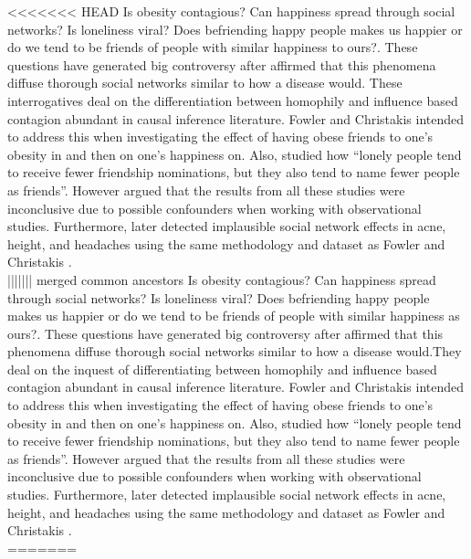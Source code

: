 \documentclass[11pt]{article}
\begin{document}
<<<<<<< HEAD
Is obesity contagious? Can happiness spread through social networks? Is loneliness viral? Does befriending happy people makes us happier or do we tend to be friends of people with similar happiness to ours?. These questions have generated big controversy after \cite{christakis2007spread} affirmed that this phenomena diffuse thorough social networks similar to how a disease would. These interrogatives deal on  the differentiation between homophily and influence based contagion abundant in causal inference literature. Fowler and Christakis intended to address this when investigating the effect of having obese friends to one’s obesity in \citep{christakis2007spread} and then on one’s happiness on. Also, \citep{cacioppo2009alone} studied how “lonely people tend to receive fewer friendship nominations, but they also tend to name fewer people as friends”. However \citep{shalizi2011homophily} argued that the results from all these studies were inconclusive due to possible confounders when working with observational studies. Furthermore, \citep{cohen2008detecting} later detected implausible social network effects in acne, height, and headaches using the same methodology and dataset as Fowler and Christakis . \\
||||||| merged common ancestors
Is obesity contagious? Can happiness spread through social networks? Is loneliness viral? Does befriending happy people makes us happier or do we tend to be friends of people with similar happiness as ours?. These questions have generated big controversy after \cite{christakis2007spread} affirmed that this phenomena diffuse thorough social networks similar to how a disease would.They deal on  the inquest of differentiating between homophily and influence based contagion abundant in causal inference literature. Fowler and Christakis intended to address this when investigating the effect of having obese friends to one’s obesity in \citep{christakis2007spread} and then on one’s happiness on. Also, \citep{cacioppo2009alone} studied how “lonely people tend to receive fewer friendship nominations, but they also tend to name fewer people as friends”. However \citep{shalizi2011homophily} argued that the results from all these studies were inconclusive due to possible confounders when working with observational studies. Furthermore, \citep{cohen2008detecting} later detected implausible social network effects in acne, height, and headaches using the same methodology and dataset as Fowler and Christakis . \\
=======
\end{document}
